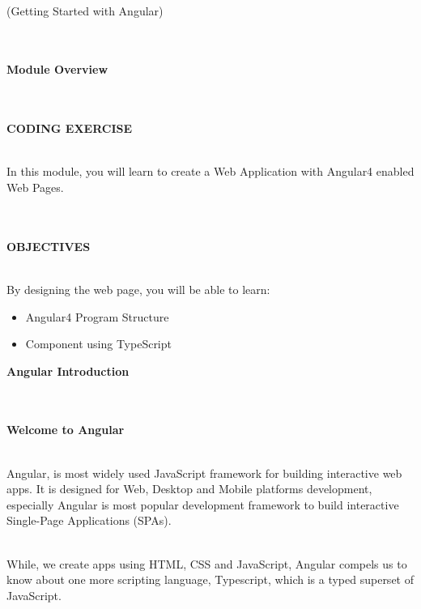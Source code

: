 \documentclass{article}
\begin{document}
\begin{center}
	\noindent \\ {\huge  (Getting Started with Angular)}
\end{center}

\noindent \textbf{}

\noindent \\ \\ {\LARGE \textbf{Module Overview }}

\noindent \\ \\ {\large \textbf{CODING EXERCISE}}

\noindent \\ In this module, you will learn to create a Web Application with Angular4 enabled Web Pages.

\noindent \\ \\ {\large \textbf{OBJECTIVES}}

\noindent \\ By designing the web page, you will be able to learn:
\begin{itemize}
	\item Angular4 Program Structure 
	\item Component using TypeScript
\end{itemize}
\newpage

\noindent\begin{center}
	 {\LARGE \textbf{Angular Introduction}}
\end{center}

\noindent \textbf{}

\noindent \\ \\ {\large \textbf{Welcome to Angular}}

\noindent \\ Angular, is most widely used JavaScript framework for building interactive web apps. It is designed for Web, Desktop and Mobile platforms development, especially Angular is most popular development framework to build interactive Single-Page Applications (SPAs).

\noindent \\ While, we create apps using HTML, CSS and JavaScript, Angular compels us to know about one more scripting language, Typescript, which is a typed superset of JavaScript.

\noindent 
\end{document}
